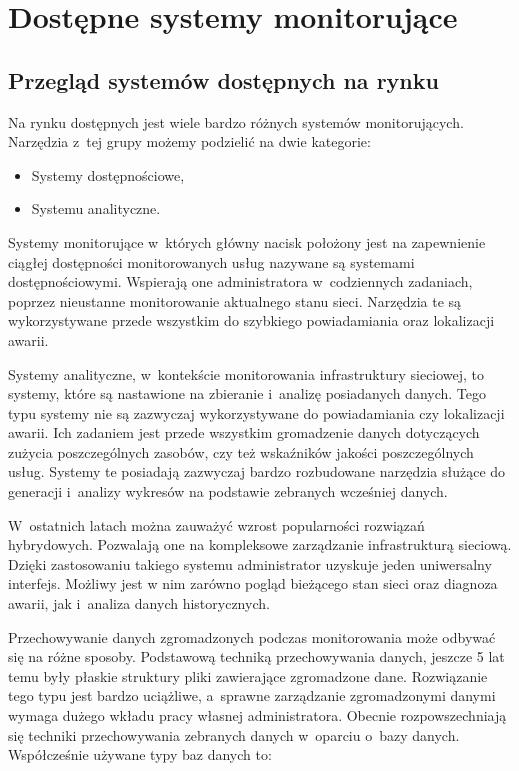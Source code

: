 \chapter{Dostępne systemy monitorujące}
\label{chap:Systemy}

\section[Przegląd systemów][Przegląd systemów dostępnych na rynku]{Przegląd systemów dostępnych na rynku}

Na rynku dostępnych jest wiele bardzo różnych systemów
monitorujących. Narzędzia z~tej grupy możemy podzielić na dwie
kategorie:

\begin{itemize}
\item Systemy dostępnościowe,
\item Systemu analityczne.
\end{itemize}

Systemy monitorujące w~których główny nacisk położony jest na
zapewnienie ciągłej dostępności monitorowanych usług nazywane są
systemami dostępnościowymi. Wspierają one administratora
w~codziennych zadaniach, poprzez nieustanne monitorowanie aktualnego
stanu sieci. Narzędzia te są wykorzystywane przede wszystkim do
szybkiego powiadamiania oraz lokalizacji awarii.

Systemy analityczne, w~kontekście monitorowania infrastruktury
sieciowej, to systemy, które są nastawione na zbieranie i~analizę
posiadanych danych. Tego typu systemy nie są zazwyczaj wykorzystywane
do powiadamiania czy lokalizacji awarii. Ich zadaniem jest przede
wszystkim gromadzenie danych dotyczących zużycia poszczególnych
zasobów, czy też wskaźników jakości poszczególnych usług. Systemy te
posiadają zazwyczaj bardzo rozbudowane narzędzia służące do generacji
i~analizy wykresów na podstawie zebranych wcześniej danych.

W~ostatnich latach można zauważyć wzrost popularności rozwiązań
hybrydowych. Pozwalają one na kompleksowe zarządzanie infrastrukturą
sieciową. Dzięki zastosowaniu takiego systemu administrator uzyskuje
jeden uniwersalny interfejs. Możliwy jest w nim zarówno pogląd
bieżącego stan sieci oraz diagnoza awarii, jak i~analiza danych
historycznych.

Przechowywanie danych zgromadzonych podczas monitorowania może odbywać
się na różne sposoby. Podstawową techniką przechowywania danych,
jeszcze 5 lat temu były płaskie struktury pliki zawierające
zgromadzone dane. Rozwiązanie tego typu jest bardzo uciążliwe,
a~sprawne zarządzanie zgromadzonymi danymi wymaga dużego wkładu pracy
własnej administratora. Obecnie rozpowszechniają się techniki
przechowywania zebranych danych w~oparciu o~bazy danych. Współcześnie
używane typy baz danych to:

